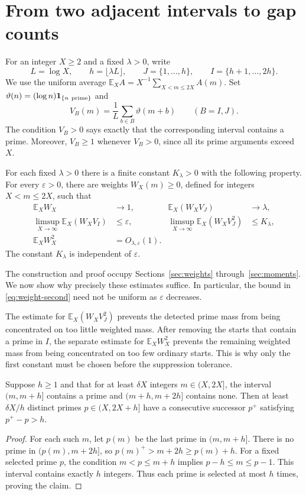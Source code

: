 \section{From two adjacent intervals to gap counts}\label{sec:counting}

For an integer $X\ge2$ and a fixed $\lambda>0$, write
\[
 L=\log X,\qquad h=\lfloor\lambda L\rfloor,\qquad
 J=\{1,\ldots,h\},\qquad I=\{h+1,\ldots,2h\}.
\]
We use the uniform average
$\mathbb E_X A=X^{-1}\sum_{X<m\le2X}A(m)$.
Set $\vartheta(n)=(\log n)\mathbf1_{\{n\ {\rm prime}\}}$ and
\[
 V_B(m)=\frac1L\sum_{b\in B}\vartheta(m+b)\qquad(B=I,J).
\]
The condition $V_B>0$ says exactly that the corresponding interval
contains a prime. Moreover, $V_B\ge1$ whenever $V_B>0$, since all
its prime arguments exceed $X$.

\begin{proposition}\label{prop:weights}
For each fixed $\lambda>0$ there is a finite constant $K_\lambda>0$
with the following property. For every $\varepsilon>0$, there are
weights $W_X(m)\ge0$, defined for integers $X<m\le2X$, such that
\begin{align}
 \mathbb E_X W_X&\longrightarrow1,
 &\mathbb E_X(W_XV_J)&\longrightarrow\lambda,\label{eq:weight-first}\\
 \limsup_{X\to\infty}\mathbb E_X(W_XV_I)&\le\varepsilon,
 &\limsup_{X\to\infty}\mathbb E_X(W_XV_J^2)&\le K_\lambda,\label{eq:weight-primes}\\
 \mathbb E_X W_X^2&=O_{\lambda,\varepsilon}(1).\label{eq:weight-second}
\end{align}
The constant $K_\lambda$ is independent of $\varepsilon$.
\end{proposition}

The construction and proof occupy Sections~\ref{sec:weights}
through~\ref{sec:moments}. We now show why precisely these estimates
suffice. In particular, the bound in \eqref{eq:weight-second} need
not be uniform as $\varepsilon$ decreases.

The estimate for $\mathbb E_X(W_XV_J^2)$ prevents the detected prime
mass from being concentrated on too little weighted mass. After removing
the starts that contain a prime in $I$, the separate estimate for
$\mathbb E_XW_X^2$ prevents the remaining weighted mass from being
concentrated on too few ordinary starts. This is why only the first
constant must be chosen before the suppression tolerance.

\begin{lemma}\label{lem:adjacent-gaps}
Suppose $h\ge1$ and that for at least $\delta X$ integers $m\in(X,2X]$, the interval
$(m,m+h]$ contains a prime and $(m+h,m+2h]$ contains none.
Then at least $\delta X/h$ distinct primes $p\in(X,2X+h]$ have a
consecutive successor $p^+$ satisfying $p^+-p>h$.
\end{lemma}
\begin{proof}
For each such $m$, let $p(m)$ be the last prime in $(m,m+h]$.
There is no prime in $(p(m),m+2h]$, so
$p(m)^+>m+2h\ge p(m)+h$.
For a fixed selected prime $p$, the condition $m<p\le m+h$ implies
$p-h\le m\le p-1$. This interval contains exactly $h$ integers.
Thus each prime is selected at most $h$ times, proving the claim.
\end{proof}

